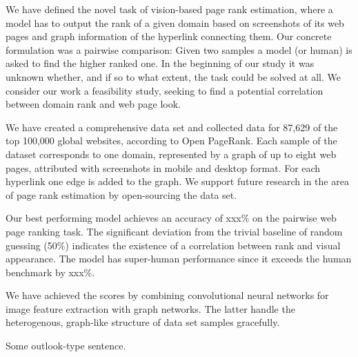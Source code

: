 We have defined the novel task of vision-based page rank estimation, where a model has to output the rank of a given domain based on screenshots of its web pages and graph information of the hyperlink connecting them. Our concrete formulation was a pairwise comparison: Given two samples a model (or human) is asked to find the higher ranked one. In the beginning of our study it was unknown whether, and if so to what extent, the task could be solved at all. We consider our work a feasibility study, seeking to find a potential correlation between domain rank and web page look.

We have created a comprehensive data set and collected data for 87,629 of the top 100,000 global websites, according to Open PageRank. Each sample of the dataset corresponds to one domain, represented by a graph of up to eight web pages, attributed with screenshots in mobile and desktop format. For each hyperlink one edge is added to the graph. We support future research in the area of page rank estimation by open-sourcing the data set.

Our best performing model achieves an accuracy of xxx\% on the pairwise web page ranking task. The significant deviation from the trivial baseline of random guessing (50\%) indicates the existence of a correlation between rank and visual appearance. The model has super-human performance since it exceeds the human benchmark by xxx\%.

We have achieved the scores by combining convolutional neural networks for image feature extraction with graph networks. The latter handle the heterogenous, graph-like structure of data set samples gracefully.

Some outlook-type sentence.
